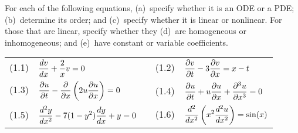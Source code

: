 
For each of the following equations, 
(a)~specify whether it is an ODE or a PDE; 
(b)~determine its order; and
(c)~specify whether it is linear or nonlinear.
For those that are linear, specify whether they 
(d)~are homogeneous or inhomogeneous; and 
(e)~have constant or variable coefficients.
\begin{center} \begin{tabular}{lcl}
(1.1)\ \  $\displaystyle {d v \over d x} + {2 \over x} v = 0$ 
& &
(1.2)\ \ $\displaystyle {\partial v \over \partial t} 
                     - 3 {\partial v \over \partial x}  = x-t $\\[2em]
(1.3)\ \  $\displaystyle {\partial u \over \partial t} 
                      - {\partial \over \partial x} 
                         \left( 2 u {\partial u \over \partial x}\right) = 0 $
& &
(1.4)\ \  $\displaystyle {\partial u \over \partial t} 
                   + u {\partial u \over \partial x} 
                   + {\partial^3 u \over \partial x^3} = 0$ \\[2em]  %
(1.5)\ \  $\displaystyle {d^2 y \over dx^2 } 
                   -7 (1-y^2) {d y \over d x} + y 
                   = 0$   %
& &
(1.6)\ \  $\displaystyle {d^2 \over dx^2} \left( x^2 {d^2 u \over d x^2}\right) 
                    = \sin(x)$  
\end{tabular}\end{center}




